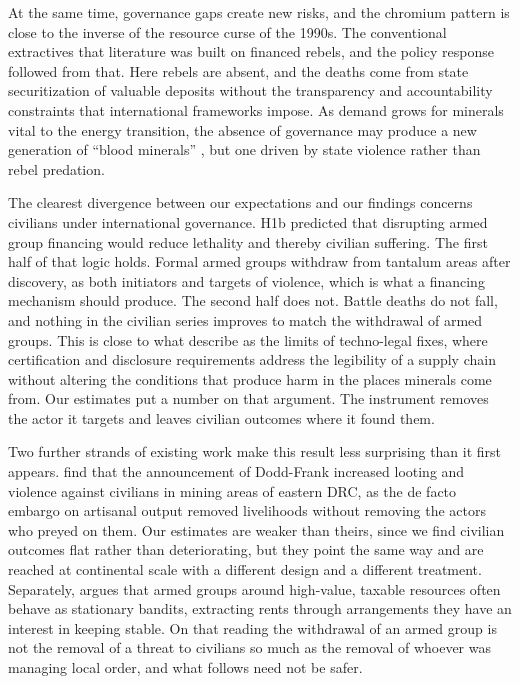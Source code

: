\documentclass[11pt]{article}
\begin{document}
At the same time, governance gaps create new risks, and the chromium pattern is close to the inverse of the resource curse of the 1990s. The conventional extractives that literature was built on financed rebels, and the policy response followed from that. Here rebels are absent, and the deaths come from state securitization of valuable deposits without the transparency and accountability constraints that international frameworks impose. As demand grows for minerals vital to the energy transition, the absence of governance may produce a new generation of ``blood minerals'' \citep{enough2009conflict}, but one driven by state violence rather than rebel predation.

The clearest divergence between our expectations and our findings concerns civilians under international governance. H1b predicted that disrupting armed group financing would reduce lethality and thereby civilian suffering. The first half of that logic holds. Formal armed groups withdraw from tantalum areas after discovery, as both initiators and targets of violence, which is what a financing mechanism should produce. The second half does not. Battle deaths do not fall, and nothing in the civilian series improves to match the withdrawal of armed groups. This is close to what \citet{deberdt2025critical} describe as the limits of techno-legal fixes, where certification and disclosure requirements address the legibility of a supply chain without altering the conditions that produce harm in the places minerals come from. Our estimates put a number on that argument. The instrument removes the actor it targets and leaves civilian outcomes where it found them.

Two further strands of existing work make this result less surprising than it first appears. \citet{stoop2018dodd} find that the announcement of Dodd-Frank increased looting and violence against civilians in mining areas of eastern DRC, as the de facto embargo on artisanal output removed livelihoods without removing the actors who preyed on them. Our estimates are weaker than theirs, since we find civilian outcomes flat rather than deteriorating, but they point the same way and are reached at continental scale with a different design and a different treatment. Separately, \citet{sanchez2020mining} argues that armed groups around high-value, taxable resources often behave as stationary bandits, extracting rents through arrangements they have an interest in keeping stable. On that reading the withdrawal of an armed group is not the removal of a threat to civilians so much as the removal of whoever was managing local order, and what follows need not be safer.
\end{document}
